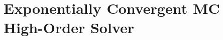 \documentclass[xcolor=dvipsnames,hyperref={pdfpagelabels=false},unknownkeysallowed]{beamer}
\newcommand{\colb}[1]{{\color{blue} #1}}
\newcommand{\colG}[1]{{\color{Gray!110} #1}}
\newcommand{\colr}[1]{{\color{red} #1}}
\newlength{\tabsep}
\begin{document}



\section{Exponentially Convergent MC High-Order Solver}
\subsection{}
\end{document}
